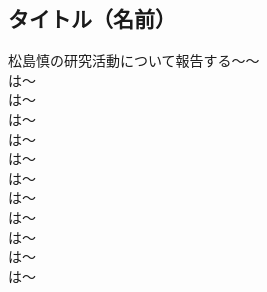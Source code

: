 \subsection{タイトル（名前）}

松島慎の研究活動について報告する〜〜\\
\cite{AA01}は〜\\
\cite{AA11}は〜\\
\cite{AA02}は〜\\
\cite{AA03}は〜\\
\cite{AA04}は〜\\
\cite{AA05}は〜\\
\cite{AA06}は〜\\
\cite{AA07}は〜\\
\cite{AA08}は〜\\
\cite{AA09}は〜\\
\cite{AA10}は〜\\

